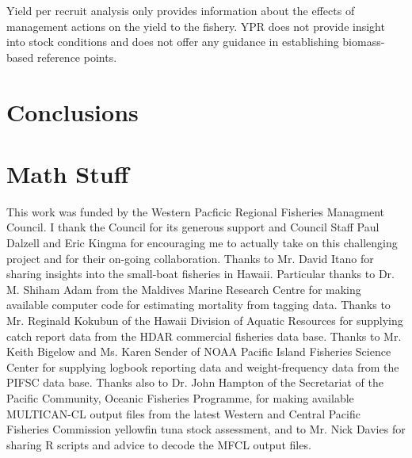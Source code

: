 \documentclass[12pt,letterpaper]{article}
\newcommand\help[1]{\color{Magenta}{\it #1 }\normalcolor}
\begin{document}
Yield per recruit analysis only provides information about the effects
of management actions on the yield to the fishery. YPR does not
provide insight into stock conditions and does not offer any guidance
in establishing biomass-based reference points.

\help{Still working on it.}

\section*{Conclusions}\help{Working on it.}


\section*{Math Stuff}\help{Working on it.}

\vspace{4ex}
This work was funded by the Western Pacficic Regional Fisheries
Managment Council. I thank the Council for its generous support and
Council Staff Paul Dalzell and Eric Kingma for encouraging me to
actually take on this challenging project and for their on-going
collaboration.
Thanks to Mr. David Itano for sharing insights into the small-boat
fisheries in Hawaii.
Particular thanks to Dr. M. Shiham Adam from the Maldives Marine
Research Centre for making available computer code for estimating
mortality from tagging data.
Thanks to Mr. Reginald Kokubun of the Hawaii Division of Aquatic
Resources for supplying catch report data from the HDAR commercial
fisheries data base.
Thanks to Mr. Keith Bigelow and Ms. Karen Sender of NOAA Pacific
Island Fisheries Science Center for supplying logbook reporting data and
weight-frequency data from the PIFSC data base.
Thanks also to Dr. John Hampton of the Secretariat of the Pacific
Community, Oceanic Fisheries Programme, for making available
MULTICAN-CL output files from the latest Western and Central Pacific
Fisheries Commission yellowfin tuna stock assessment, and to Mr. Nick
Davies for sharing R scripts and advice to decode the MFCL output files.
\end{document}
